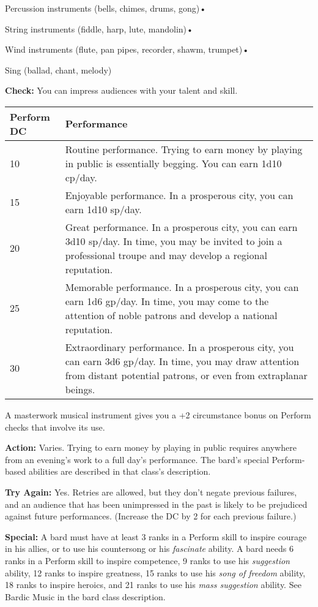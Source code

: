 \documentclass{article}
\begin{document}
Percussion instruments (bells, chimes, drums, gong)• 

String instruments (fiddle, harp, lute, mandolin)• 

Wind instruments (flute, pan pipes, recorder, shawm, trumpet)• 

Sing (ballad, chant, melody)

\textbf{Check:} You can impress audiences with your talent and skill.

\begin{tabular}{|>{\raggedright}p{27pt}|>{\raggedright}p{298pt}|}
\hline
P\textbf{erform DC} & P\textbf{erformance}\tabularnewline
\hline
10 & Routine performance. Trying to earn money by playing in public is essentially 
begging. You can earn 1d10 cp/day.\tabularnewline
\hline
15 & Enjoyable performance. In a prosperous city, you can earn 1d10 sp/day.\tabularnewline
\hline
20 & Great performance. In a prosperous city, you can earn 3d10 sp/day. In time, 
you may be invited to join a professional troupe and may develop a regional reputation.\tabularnewline
\hline
25 & Memorable performance. In a prosperous city, you can earn 1d6 gp/day. In time, 
you may come to the attention of noble patrons and develop a national reputation.\tabularnewline
\hline
30 & Extraordinary performance. In a prosperous city, you can earn 3d6 gp/day. 
In time, you may draw attention from distant potential patrons, or even from extraplanar 
beings.\tabularnewline
\hline
\end{tabular}

\vspace{12pt}
A masterwork musical instrument gives you a +2 circumstance bonus on Perform checks 
that involve its use.

\textbf{Action:} Varies. Trying to earn money by playing in public requires anywhere 
from an evening's work to a full day's performance. The bard's special Perform-based 
abilities are described in that class's description.

\textbf{Try Again:} Yes. Retries are allowed, but they don't negate previous failures, 
and an audience that has been unimpressed in the past is likely to be prejudiced 
against future performances. (Increase the DC by 2 for each previous failure.)

\textbf{Special:} A bard must have at least 3 ranks in a Perform skill to inspire 
courage in his allies, or to use his countersong or his \textit{fascinate }ability. 
A bard needs 6 ranks in a Perform skill to inspire competence, 9 ranks to use his 
\textit{suggestion }ability, 12 ranks to inspire greatness, 15 ranks to use his 
\textit{song of freedom }ability, 18 ranks to inspire heroics, and 21 ranks to 
use his \textit{mass suggestion }ability. See Bardic Music in the bard class description.
\end{document}
